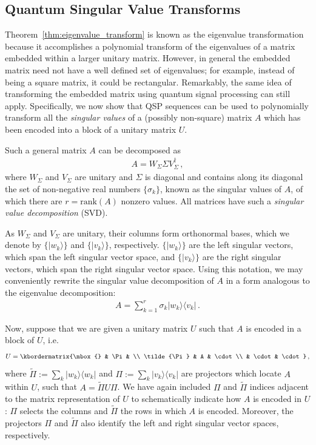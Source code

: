 \documentclass[aps,pra,showpacs,notitlepage,twocolumn,superscriptaddress,nofootinbib]{revtex4-1}
\def\>{\rangle}
\def\<{\langle}
\newcommand{\bea}{\begin{eqnarray}}
\newcommand{\eea}{\end{eqnarray}}
\begin{document}
\subsection{Quantum Singular Value Transforms}\label{sec:qsvt}

Theorem~\ref{thm:eigenvalue_transform} is known as the eigenvalue transformation because it accomplishes a polynomial transform of the eigenvalues of a matrix embedded within a larger unitary matrix. However, in general the embedded matrix need not have a well defined set of eigenvalues; for example, instead of being a square matrix, it could be rectangular. Remarkably, the same idea of transforming the embedded matrix using quantum signal processing can still apply. Specifically, we now show that QSP sequences can be used to polynomially transform all the {\em singular values} of a (possibly non-square) matrix $A$ which has been encoded into a block of a unitary matrix $U$.

Such a general matrix $A$ can be decomposed as 
    \bea
    	A = W_\Sigma\Sigma V^\dag_\Sigma
    \,,
    \eea
where $W_\Sigma$ and $V_\Sigma$ are unitary and $\Sigma$ is diagonal and contains along its diagonal the set of non-negative real numbers $\{ \sigma_k\}$, known as the singular values of $A$, of which there are $r=\text{rank}(A)$ nonzero values.  All matrices have such a {\em singular value decomposition} (SVD).

As $W_\Sigma$ and $V_\Sigma$ are unitary, their columns form orthonormal bases, which we denote by $\{|w_k\>\}$ and $\{|v_k\>\}$, respectively. $\{|w_k\>\}$ are the left singular vectors, which span the left singular vector space, and $\{|v_k\>\}$ are the right singular vectors, which span the right singular vector space. Using this notation, we may conveniently rewrite the singular value decomposition of $A$ in a form analogous to the eigenvalue decomposition: 
    \bea
    	A = \sum_{k=1}^r  \sigma_k |w_k\>\<v_k|
    \,.
    \eea

Now, suppose that we are given a unitary matrix $U$ such that $A$ is encoded in a block of $U$, i.e.
    \bea
        U = \kbordermatrix{\mbox{} & \Pi &  \\
          \tilde{\Pi} & A     & \cdot \\ 
                      & \cdot & \cdot 
        }
        \,,
        \label{eq:block_u_A}
    \eea
where $\tilde\Pi := \sum_k |w_k\>\<w_k|$ and $\Pi := \sum_k |v_k\>\<v_k|$ are projectors which locate $A$ within $U$, such that $A={\tilde{\Pi}} U \Pi$. We have again included $\Pi$ and $\tilde{\Pi}$ indices adjacent to the matrix representation of $U$ to schematically indicate how $A$ is encoded in $U$: $\Pi$ selects the columns and $\tilde{\Pi}$ the rows in which $A$ is encoded. Moreover, the projectors $\Pi$ and $\tilde{\Pi}$ also identify the left and right singular vector spaces, respectively. 
\end{document}
